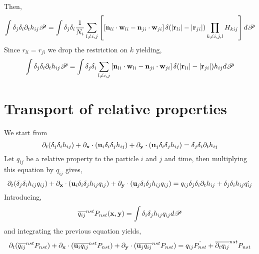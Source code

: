 Then, 
\begin{equation*}
    \int \delta_j\delta_i\partial_t h_{ij} \mathscr{P}
    = \int \delta_j \delta_i
    \frac{1}{N_i} \sum_{l \neq i,j} \left[
        \left[
    \textbf{n}_{li}\cdot \textbf{w}_{li}
    - 
    \textbf{n}_{ji}\cdot\textbf{w}_{ji}
    \right]\delta(|\textbf{r}_{li}| - |\textbf{r}_{ji}|)
        \prod_{k \neq i,j,l}
        H_{kij} 
        \right] d\mathscr{P}
\end{equation*}
Since $r_{li} = r_{ji}$ we drop the restriction on $k$ yielding, 
\begin{equation*}
    \int \delta_j\delta_i\partial_t h_{ij} \mathscr{P}
    = \int \delta_j \delta_i
    \sum_{l \neq i,j} \left[
    \textbf{n}_{li}\cdot \textbf{w}_{li}
    - 
    \textbf{n}_{ji}\cdot\textbf{w}_{ji}
    \right]\delta(|\textbf{r}_{li}| - |\textbf{r}_{ji}|)
        h_{ij}d\mathscr{P}
\end{equation*}


\section*{Transport of relative properties}

We start from 
\begin{equation}
    \partial_t (\delta_j\delta_i h_{ij}) + \partial_\textbf{x} \cdot (\textbf{u}_i \delta_i\delta_j h_{ij}) + \partial_\textbf{y} \cdot (\textbf{u}_j \delta_i\delta_j h_{ij}) = \delta_j\delta_i\partial_t h_{ij}
\end{equation}
Let $q_{ij}$ be a relative property to the particle $i$ and $j$ and time, then multiplying this equation by $q_{ij}$ gives,
\begin{equation}
    \partial_t (\delta_j\delta_i h_{ij}q_{ij}) 
    + \partial_\textbf{x} \cdot (\textbf{u}_i \delta_i\delta_j h_{ij}q_{ij}) 
    + \partial_\textbf{y} \cdot (\textbf{u}_j \delta_i\delta_j h_{ij}q_{ij}) 
    = q_{ij}\delta_j\delta_i\partial_t h_{ij}
    + \delta_j\delta_i h_{ij}\dot{q_{ij}}
\end{equation}
Introducing, 
\begin{equation*}
    \overline{q_{ij}}^{nst} P_{nst}(\textbf{x},\textbf{y})= \int\delta_i\delta_j h_{ij}q_{ij} d\mathscr{P} 
\end{equation*}
and integrating the previous equation yields, 
\begin{equation}
    \partial_t (\overline{q_{ij}}^{nst} P_{nst}) 
    + \partial_\textbf{x} \cdot (\overline{\textbf{u}_i q_{ij}}^{nst} P_{nst}) 
    + \partial_\textbf{y} \cdot (\overline{\textbf{u}_j q_{ij}}^{nst}P_{nst}) 
    = q_{ij}\dot{P_{nst}}
    + \overline{\partial_t q_{ij}}^{nst}P_{nst}
\end{equation}

